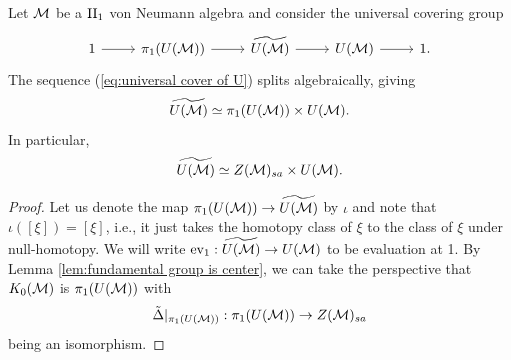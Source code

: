 \documentclass{amsart}
\begin{document}
\begin{theorem}
Let $\mathcal{M}$ be a $\text{II}_1$ von Neumann algebra and consider the universal covering group
\begin{equation}\label{eq:universal cover of U}
\begin{tikzcd}
1 \arrow[r] & \pi_1(U(\cM)) \arrow[r] & \widetilde{U(\cM)} \arrow[r] & U(\cM) \arrow[r] & 1.
\end{tikzcd}
\end{equation}
The sequence (\ref{eq:universal cover of U}) splits algebraically, giving
\begin{equation}
\widetilde{U(\mathcal{M})} \simeq \pi_1(U(\mathcal{M})) \times U(\mathcal{M}).
\end{equation}
In particular,
\begin{equation}\label{eq:cg is Z times U}
\widetilde{U(\mathcal{M})} \simeq Z(\mathcal{M})_{sa} \times U(\mathcal{M}).
\end{equation}
\begin{proof}
Let us denote the map $\pi_1(U(\mathcal{M})) \to \widetilde{U(\mathcal{M})}$ by $\iota$ and note that $\iota([\xi]) = [\xi]$, i.e., it just takes the homotopy class of $\xi$ to the class of $\xi$ under null-homotopy.
We will write $\text{ev}_1: \widetilde{U(\mathcal{M})} \to U(\mathcal{M})$ to be evaluation at 1.  
By Lemma \ref{lem:fundamental group is center}, we can take the perspective that $K_0(\mathcal{M})$ is $\pi_1(U(\mathcal{M}))$ with
\begin{equation}
\tilde{\Delta}|_{\pi_1(U(\mathcal{M}))}: \pi_1(U(\mathcal{M})) \to Z(\mathcal{M})_{sa}
\end{equation}
being an isomorphism.


\end{proof}
\end{theorem}
\end{document}
